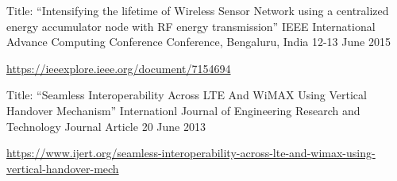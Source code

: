 \begin{cventries}
\cventry
    {Title: “Intensifying the lifetime of Wireless Sensor Network using a centralized energy accumulator node with RF energy transmission”} %
    {IEEE International Advance Computing Conference} %
    {Conference, Bengaluru, India} %
    {12-13 June 2015} %
    {
      \begin{cvitems} %
        \item{\url{https://ieeexplore.ieee.org/document/7154694}}
      \end{cvitems}
    }
    

 \cventry
    {Title: “Seamless Interoperability Across LTE And WiMAX Using Vertical Handover Mechanism”} %
    {Internationl Journal of Engineering Research and Technology} %
    {Journal Article} %
    {20 June 2013} %
    {
      \begin{cvitems} %
        \item{\url{https://www.ijert.org/seamless-interoperability-across-lte-and-wimax-using-vertical-handover-mech}}
      \end{cvitems}
    }


\end{cventries}
